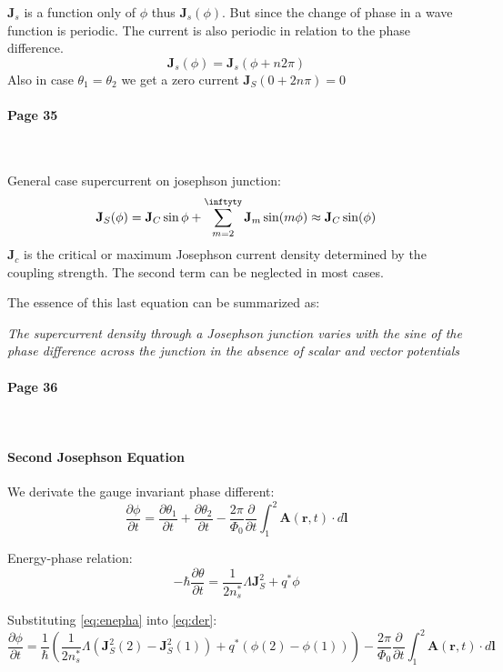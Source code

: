 \documentclass[12pt]{article}
\numberwithin{equation}{subsection}
\newcommand\page[1]{
{
\color{blue}\paragraph{
Page #1
}\mbox{}\\
}
}
\begin{document}
$\mathbf J_s$ is a function only of $\phi$ thus $\mathbf J_s(\phi)$. But since the change of phase in a wave function is periodic. The current is also periodic in relation to the phase difference.
\begin{equation}
    \mathbf J_s(\phi) = \mathbf J_s(\phi+n2\pi)
\end{equation}
Also in case $\theta_1=\theta_2$ we get a zero current $\mathbf J_S (0+2n\pi)=0$
\page{35}

General case supercurrent on josephson junction:
\begin{equation}
    \mathbf J_S (\phi) = \mathbf J_C \sin \phi + \sum^{\inftyty}_{m=2} \mathbf J_m \sin(m\phi) \approx \mathbf J_C \sin (\phi)
    \label{eq:currphase}
\end{equation}
$\mathbf J_c$ is the critical or maximum Josephson current density determined by the coupling strength. The second term can be neglected in most cases.

The essence of this last equation can be summarized as:

\emph{The supercurrent density through a Josephson junction varies with the sine of the phase difference across the junction in the absence of scalar and vector potentials}
\page{36}

\paragraph{Second Josephson Equation\\}

We derivate the gauge invariant phase different:
\begin{equation}
    \frac{\partial \phi}{\partial t} = \frac{\partial \theta_1}{\partial t}+\frac{\partial \theta_2}{\partial t} - \frac{2\pi}{\Phi_0}\frac{\partial}{\partial t} \int_1^2 \mathbf A(\mathbf r, t) \cdot d \mathbf l
    \label{eq:der}
\end{equation}

Energy-phase relation:
\begin{equation}
    -\hbar \frac{\partial \theta}{\partial t} = \frac{1}{2n^*_s} \Lambda \mathbf J^2_S +q^*\phi
    \label{eq:enepha}
\end{equation}

Substituting \ref{eq:enepha} into \ref{eq:der}:
\begin{equation}
    \frac{\partial \phi}{\partial t} = \frac{1}{\hbar} \left( \frac{1}{2n^*_s} \Lambda  (\mathbf J^2_S(2)- \mathbf J^2_S(1)) +q^*(\phi(2)-\phi(1)) \right)- \frac{2\pi}{\Phi_0}\frac{\partial}{\partial t} \int_1^2 \mathbf A(\mathbf r, t) \cdot d \mathbf l
    \label{eq:der}
\end{equation}
\end{document}
